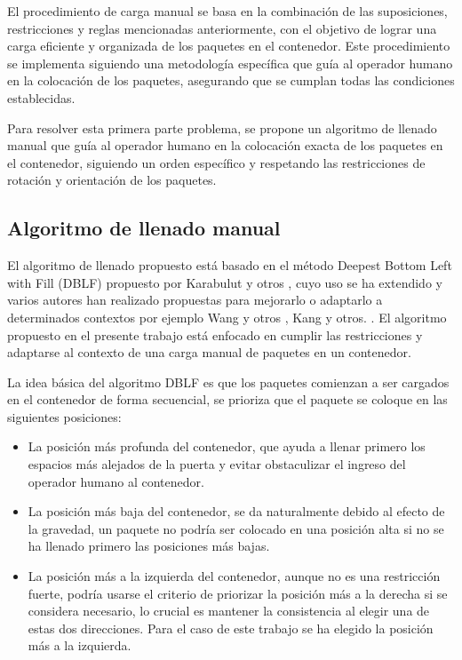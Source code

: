 El procedimiento de carga manual se basa en la combinación de las suposiciones, restricciones y reglas mencionadas anteriormente, con el objetivo de lograr una carga eficiente y organizada de los paquetes en el contenedor. Este procedimiento se implementa siguiendo una metodología específica que guía al operador humano en la colocación de los paquetes, asegurando que se cumplan todas las condiciones establecidas.

Para resolver esta primera parte problema, se propone un algoritmo de llenado manual que guía al operador humano en la colocación exacta de los paquetes en el contenedor, siguiendo un orden específico y respetando las restricciones de rotación y orientación de los paquetes.

\subsection{Algoritmo de llenado manual}

El algoritmo de llenado propuesto está basado en el método Deepest Bottom Left with Fill (DBLF) propuesto por Karabulut y otros \cite{karabulut2004hybrid}, cuyo uso se ha extendido y varios autores han realizado propuestas para mejorarlo o adaptarlo a determinados contextos por ejemplo Wang y otros \cite{wang2010hybrid}, Kang y otros. \cite{kang2012hybrid}. El algoritmo propuesto en el presente trabajo está enfocado en cumplir las restricciones y adaptarse al contexto de una carga manual de paquetes en un contenedor.

La idea básica del algoritmo DBLF es que los paquetes comienzan a ser cargados en el contenedor de forma secuencial, se prioriza que el paquete se coloque en las siguientes posiciones: 

\begin{itemize}
    \item La posición más profunda del contenedor, que ayuda a llenar primero los espacios más alejados de la puerta y evitar obstaculizar el ingreso del operador humano al contenedor.
    \item La posición más baja del contenedor, se da naturalmente debido al efecto de la gravedad, un paquete no podría ser colocado en una posición alta si no se ha llenado primero las posiciones más bajas.
    \item La posición más a la izquierda del contenedor, aunque no es una restricción fuerte, podría usarse el criterio de priorizar la posición más a la derecha si se considera necesario, lo crucial es mantener la consistencia al elegir una de estas dos direcciones. Para el caso de este trabajo se ha elegido la posición más a la izquierda.
\end{itemize}

